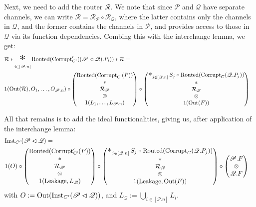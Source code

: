 \begin{theorem}
Next, we need to add the router $\mathcal{R}$.
We note that since $\mathscr{P}$ and $\mathscr{Q}$ have separate channels,
we can write $\mathcal{R} = \mathcal{R}_{\mathscr{P}} \circ \mathcal{R}_{\mathscr{Q}}$,
where the latter contains only the channels in $\mathscr{Q}$,
and the former contains the channels in $\mathscr{P}$,
and provides access to those in $\mathscr{Q}$ via its function dependencies.
Combing this with the interchange lemma, we get:
$$
\begin{aligned}
&\mathcal{R} * \bigast_{i \in [\mathscr{P}.n]}\tx{Routed}(\tx{Corrupt}'_{C'}((\mathscr{P} \lhd \mathscr{Q}).P_i)) * \mathcal{R} =\cr
&1(\tx{Out}(\mathcal{R}), O_1, \ldots, O_{\mathscr{P}.n}) \circ
\begin{pmatrix}
  \tx{Routed}(\tx{Corrupt}_{\tx{C'}}(P))\cr
  *\cr
  \mathcal{R}_{\mathscr{P}}\cr
  \otimes\cr
  1(L_1, \ldots, L_{\mathscr{P}.n})
\end{pmatrix}
\circ
\begin{pmatrix}
\bigast_{j \in [\mathscr{Q}.n]}
  S_j \circ \tx{Routed}(\tx{Corrupt}_C(\mathscr{Q}.P_j))
  \cr
  *\cr
  \mathcal{R}_{\mathscr{Q}}\cr
  \otimes\cr
  1(\tx{Out}(F))
\end{pmatrix}
\end{aligned}
$$

All that remains is to add the ideal functionalities, giving us,
after application of the interchange lemma:
$$
\begin{aligned}
  &\tx{Inst}_{C'}(\mathscr{P} \lhd \mathscr{Q}) =\cr
&1(O) \circ
\begin{pmatrix}
  \tx{Routed}(\tx{Corrupt}'_{\tx{C'}}(P))\cr
  *\cr
  \mathcal{R}_{\mathscr{P}}\cr
  \otimes\cr
  1(\tx{Leakage}, L_{\mathscr{Q}})
\end{pmatrix}
\circ
\begin{pmatrix}
\bigast_{j \in [\mathscr{Q}.n]}
  S_j \circ \tx{Routed}(\tx{Corrupt}_C(\mathscr{Q}.P_j))
  \cr
  *\cr
  \mathcal{R}_{\mathscr{Q}}\cr
  \otimes\cr
  1(\tx{Leakage}, \tx{Out}(F))
\end{pmatrix}
\circ
\begin{pmatrix}
  \mathscr{P}.F\cr
  \otimes\cr
  \mathscr{Q}.F
\end{pmatrix}
\end{aligned}
$$
with $O := \text{Out}(\text{Inst}_{C'}(\mathscr{P} \lhd \mathscr{Q}))$,
and $L_{\mathscr{Q}} := \bigcup_{i \in [\mathscr{P}.n]} L_i$.


\end{theorem}
